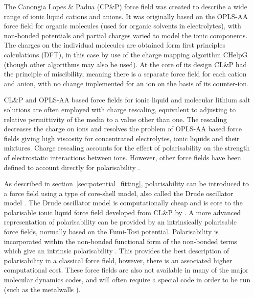 \documentclass[../main.tex]{subfiles}
\begin{document}
The Canongia Lopes \& Padua (CP\&P) force field \cite{canongia_lopes_clp_2012, canongia_lopes_modeling_2004, canongia_lopes_molecular_2004, canongia_lopes_molecular_2006} was created to describe a wide range of ionic liquid cations and anions. It was originally based on the OPLS-AA force field for organic molecules (used for organic solvents in electrolytes), with non-bonded potentials and partial charges varied to model the ionic components. The charges on the individual molecules are obtained form first principles calculations (DFT), in this case by use of the charge mapping algorithm CHelpG\cite{canongia_lopes_clp_2012} (though other algorithms may also be used\cite{spackman_potential_1996,breneman_determining_1990,singh_approach_1984}). At the core of its design CL\&P had the principle of miscibility, meaning there is a separate force field for each cation and anion, with no change implemented for an ion on the basis of its counter-ion.

CL\&P and OPLS-AA based force fields for ionic liquid and molecular lithium salt solutions are often employed with charge rescaling, equivalent to adjusting to relative permittivity of the media to a value other than one. The rescaling decreases the charge on ions and resolves the problem of OPLS-AA based force fields giving high viscosity for concentrated electrolytes, ionic liquids and their mixtures\cite{schroder_comparing_2012, schroder_polarizable_2020, shimizu_structural_2015}. Charge rescaling accounts for the effect of polarisability on the strength of electrostatic interactions between ions. However, other force fields have been defined to account directly for polarisability \cite{schroder_polarizable_2020}.

As described in section~\ref{sec:potential_fitting}, polarisability can be introduced to a force field using a type of core-shell model, also called the Drude oscillator model \cite{schroder_polarizable_2020, schroder_comparing_2012, lindahl_gromacs_2021}. The Drude oscillator model is computationally cheap and is core to the polarisable ionic liquid force field developed from CL\&P by \citeauthor{schroder_comparing_2012} \cite{schroder_comparing_2012}. A more advanced representation of polarisability can be provided by an intrinsically polarisable force fields, normally based on the Fumi-Tosi potential. Polarisability is incorporated within the non-bonded functional form of the non-bonded terms which give an intrinsic polarisability \cite{madden_covalent_1996, borodin_polarizable_2009, schroder_polarizable_2020, borodin_litfsi_2006,bedrov_molecular_2019,bedrov_influence_2010}. This provides the best description of polarisability in a classical force field, however, there is an associated higher computational cost. These force fields are also not available in many of the major molecular dynamics codes, and will often require a special code in order to be run (such as the metalwalls \cite{marin-lafleche_metalwalls_2020}).
\end{document}
